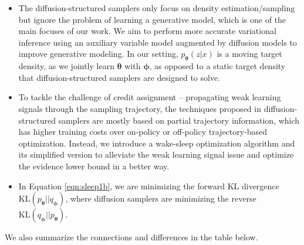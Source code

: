 \documentclass[letterpaper]{article} %
\newcommand\KL{\text{KL}}
\let\oldtheta\theta
\renewcommand{\theta}{{\boldsymbol \oldtheta}}
\let\oldphi\phi
\renewcommand{\phi}{{\boldsymbol \oldphi}}
\begin{document}
\begin{itemize}
    \item The diffusion-structured samplers only focus on density estimation/sampling but ignore the problem of learning a generative model, which is one of the main focuses of our work. We aim to perform more accurate variational inference using an auxiliary variable model augmented by diffusion models to improve generative modeling. In our setting, $p_\theta(z|x)$ is a moving target density, as we jointly learn $\theta$ with $\phi$, as opposed to a static target density that diffusion-structured samplers are designed to solve.
    \item To tackle the challenge of credit assignment – propagating weak learning signals through the sampling trajectory, the techniques proposed in diffusion-structured samplers are mostly based on partial trajectory information, which has higher training costs over on-policy \cite{zhang2021path} or off-policy \cite{malkin2022trajectory} trajectory-based optimization. Instead, we introduce a wake-sleep optimization algorithm and its simplified version to alleviate the weak learning signal issue and optimize the evidence lower bound in a better way.
    \item In Equation \ref{eqn:sleep1b}, we are minimizing the forward KL divergence $\KL (p_\theta || q_\phi)$, where diffusion samplers are minimizing the reverse $\KL (q_\phi || p_\theta)$.
\end{itemize}

We also summarize the connections and differences in the table below.
\end{document}
